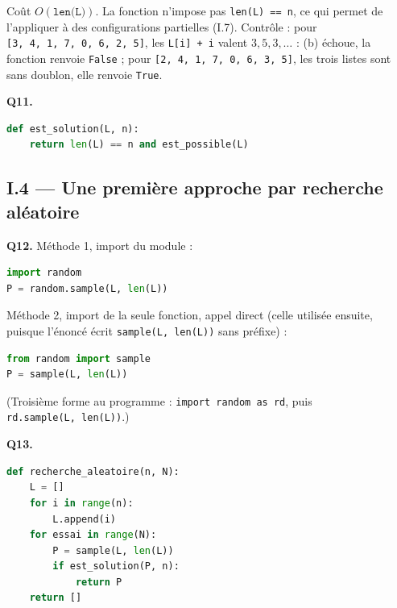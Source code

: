 \documentclass[11pt,a4paper]{article}
\begin{document}
Coût \(O(\texttt{len(L)})\). La fonction n'impose pas \texttt{len(L)\ ==\ n}, ce qui permet de l'appliquer à des configurations partielles (I.7). Contrôle : pour \texttt{{[}3,\allowbreak{}\ 4,\allowbreak{}\ 1,\allowbreak{}\ 7,\allowbreak{}\ 0,\allowbreak{}\ 6,\allowbreak{}\ 2,\allowbreak{}\ 5{]}\allowbreak{}}, les \texttt{L{[}i{]}\ +\ i} valent \(3, 5, 3, \dots\) : (b) échoue, la fonction renvoie \texttt{False} ; pour \texttt{{[}2,\allowbreak{}\ 4,\allowbreak{}\ 1,\allowbreak{}\ 7,\allowbreak{}\ 0,\allowbreak{}\ 6,\allowbreak{}\ 3,\allowbreak{}\ 5{]}\allowbreak{}}, les trois listes sont sans doublon, elle renvoie \texttt{True}.

\textbf{Q11.}

\begin{lstlisting}[language=Python]
def est_solution(L, n):
    return len(L) == n and est_possible(L)
\end{lstlisting}

\hypertarget{i.4-une-premiuxe8re-approche-par-recherche-aluxe9atoire}{%
\subsection{I.4 --- Une première approche par recherche aléatoire}\label{i.4-une-premiuxe8re-approche-par-recherche-aluxe9atoire}}

\textbf{Q12.} Méthode 1, import du module :

\begin{lstlisting}[language=Python]
import random
P = random.sample(L, len(L))
\end{lstlisting}

Méthode 2, import de la seule fonction, appel direct (celle utilisée ensuite, puisque l'énoncé écrit \texttt{sample(\allowbreak{}L,\allowbreak{}\ len(\allowbreak{}L)\allowbreak{})\allowbreak{}} sans préfixe) :

\begin{lstlisting}[language=Python]
from random import sample
P = sample(L, len(L))
\end{lstlisting}

(Troisième forme au programme : \texttt{import\ random\ as\ rd}, puis \texttt{rd.sample(\allowbreak{}L,\allowbreak{}\ len(\allowbreak{}L)\allowbreak{})\allowbreak{}}.)

\textbf{Q13.}

\begin{lstlisting}[language=Python]
def recherche_aleatoire(n, N):
    L = []
    for i in range(n):
        L.append(i)
    for essai in range(N):
        P = sample(L, len(L))
        if est_solution(P, n):
            return P
    return []
\end{lstlisting}
\end{document}
